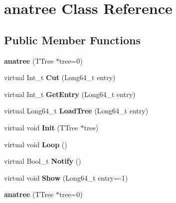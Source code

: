 \hypertarget{classanatree}{\section{anatree Class Reference}
\label{classanatree}
}
\subsection*{Public Member Functions}
\begin{DoxyCompactItemize}
\item 
\hypertarget{classanatree_a681468883d8d6ce67ef59bc627336ae7}{{\bfseries anatree} (T\-Tree $\ast$tree=0)}\label{classanatree_a681468883d8d6ce67ef59bc627336ae7}

\item 
\hypertarget{classanatree_af469e80902746c85deeab7a0e1b13b59}{virtual Int\-\_\-t {\bfseries Cut} (Long64\-\_\-t entry)}\label{classanatree_af469e80902746c85deeab7a0e1b13b59}

\item 
\hypertarget{classanatree_a3ead58a94b63a5af3188b31514693e39}{virtual Int\-\_\-t {\bfseries Get\-Entry} (Long64\-\_\-t entry)}\label{classanatree_a3ead58a94b63a5af3188b31514693e39}

\item 
\hypertarget{classanatree_aa7d2bc2d5c95833df9fe2aa61b1f78c9}{virtual Long64\-\_\-t {\bfseries Load\-Tree} (Long64\-\_\-t entry)}\label{classanatree_aa7d2bc2d5c95833df9fe2aa61b1f78c9}

\item 
\hypertarget{classanatree_a751a3a2b9b93761020d01def145f96a9}{virtual void {\bfseries Init} (T\-Tree $\ast$tree)}\label{classanatree_a751a3a2b9b93761020d01def145f96a9}

\item 
\hypertarget{classanatree_af4572d1a51c63514970df7ea9d820b93}{virtual void {\bfseries Loop} ()}\label{classanatree_af4572d1a51c63514970df7ea9d820b93}

\item 
\hypertarget{classanatree_a74d59c62b910973adb4f56454b644dd4}{virtual Bool\-\_\-t {\bfseries Notify} ()}\label{classanatree_a74d59c62b910973adb4f56454b644dd4}

\item 
\hypertarget{classanatree_aa20c82c0f6f2e8a8ff1ee5ae999aebb9}{virtual void {\bfseries Show} (Long64\-\_\-t entry=-\/1)}\label{classanatree_aa20c82c0f6f2e8a8ff1ee5ae999aebb9}

\item 
\hypertarget{classanatree_a681468883d8d6ce67ef59bc627336ae7}{{\bfseries anatree} (T\-Tree $\ast$tree=0)}\label{classanatree_a681468883d8d6ce67ef59bc627336ae7}


\end{DoxyCompactItemize}
